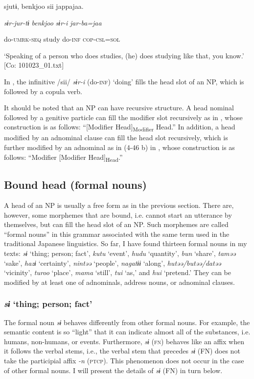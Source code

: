     sjutɨ,  {\textbar}benkjoo{\textbar}  sii  jappajaa.

    \textit{sɨr-jur-tɨ}  \textit{benkjoo}  \textit{sɨr-i}  \textit{jar-ba=jaa}

    do-\textsc{umrk}-\textsc{seq}  study  do-\textsc{inf}  \textsc{cop}-\textsc{csl}=\textsc{sol}

\glt    ‘Speaking of a person who does studies, (he) does studying like that, you know.’ [Co: 101023\_01.txt]
\z

In , the infinitive /sii/ \textit{sɨr-i} (do-\textsc{inf}) ‘doing’ fills the head slot of an NP, which is followed by a copula verb.

It should be noted that an NP can have recursive structure. A head nominal followed by a genitive particle can fill the modifier slot recursively as in , whose construction is as follows: “[Modifier Head]\textsubscript{Modifier} Head.” In addition, a head modified by an adnominal clause can fill the head slot recursively, which is further modified by an adnominal as in (4-46 b) in , whose construction is as follows: “Modifier [Modifier Head]\textsubscript{Head}.”

\subsection{Bound head (formal nouns)}

A head of an NP is usually a free form as in the previous section. There are, however, some morphemes that are bound, i.e. cannot start an utterance by themselves, but can fill the head slot of an NP. Such morphemes are called “formal nouns” in this grammar associated with the same term used in the traditional Japanese linguistics. So far, I have found thirteen formal nouns in my texts: \textit{sɨ} ‘thing; person; fact’, \textit{kutu} ‘event’, \textit{hudu} ‘quantity’, \textit{bun} ‘share’, \textit{taməə} ‘sake’, \textit{hazɨ} ‘certainty’, \textit{nintəə} ‘people’, \textit{nagatɨɨ} ‘along’, \textit{hutəə/butəə/datəə} ‘vicinity’, \textit{turoo} ‘place’, \textit{mama} ‘still’, \textit{tui} ‘as,’ and \textit{hui} ‘pretend.’ They can be modified by at least one of adnominals, address nouns, or adnominal clauses.

\subsubsection{\textit{sɨ} ‘thing; person; fact’}

The formal noun \textit{sɨ} behaves differently from other formal nouns. For example, the semantic content is so “light” that it can indicate almost all of the substances, i.e. humans, non-humans, or events. Furthermore, \textit{sɨ} (\textsc{fn}) behaves like an affix when it follows the verbal stems, i.e., the verbal stem that precedes \textit{sɨ} (FN) does not take the participial affix \textit{{}-n} (\textsc{ptcp}). This phenomenon does not occur in the case of other formal nouns. I will present the details of \textit{sɨ} (FN) in turn below.

